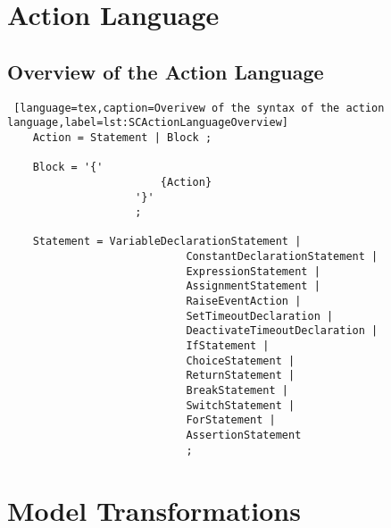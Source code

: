 \appendix

\chapter{Action Language}
\section{Overview of the Action Language}
\bigskip
\begin{lstlisting} [language=tex,caption=Overivew of the syntax of the action language,label=lst:SCActionLanguageOverview]
	Action = Statement | Block ;
	
	Block = '{'
						{Action}
					'}' 
					;
					
	Statement = VariableDeclarationStatement |
							ConstantDeclarationStatement | 
							ExpressionStatement |
							AssignmentStatement |
							RaiseEventAction |
							SetTimeoutDeclaration |
							DeactivateTimeoutDeclaration |
							IfStatement |
							ChoiceStatement |
							ReturnStatement |
							BreakStatement |
							SwitchStatement |
							ForStatement |
							AssertionStatement
							;		
\end{lstlisting}

\chapter{Model Transformations}
\newpage
